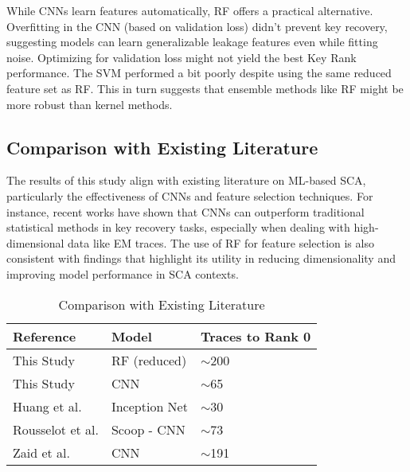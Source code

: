 \documentclass[runningheads]{llncs}
\begin{document}
While CNNs learn features automatically, RF offers a practical alternative. Overfitting in the CNN (based on validation loss) didn't prevent key recovery, suggesting models can learn generalizable leakage features even while fitting noise. Optimizing for validation loss might not yield the best Key Rank performance. The SVM performed a bit poorly despite using the same reduced feature set as RF. This in turn suggests that ensemble methods like RF might be more robust than kernel methods.

\subsection{Comparison with Existing Literature}
The results of this study align with existing literature on ML-based SCA, particularly the effectiveness of CNNs and feature selection techniques. For instance, recent works have shown that CNNs can outperform traditional statistical methods in key recovery tasks, especially when dealing with high-dimensional data like EM traces. The use of RF for feature selection is also consistent with findings that highlight its utility in reducing dimensionality and improving model performance in SCA contexts.
\begin{table}[htbp]
    \centering
    \caption{Comparison with Existing Literature}
    \label{tab:literature_comparison}
    \begin{tabular}{|p{3.5cm}|p{3.5cm}|p{3.5cm}|}
        
        \hline
        \textbf{Reference} & \textbf{Model} & \textbf{Traces to Rank 0} \\
        \hline
        This Study & RF (reduced) & $\sim$200  \\
        \hline
        This Study & CNN & $\sim$65  \\
        \hline
        Huang et al.\cite{huang2025deep} & Inception Net & $\sim$30   \\
        \hline
        Rousselot et al. \cite{rousselot2025scoop} & Scoop - CNN & $\sim$73  \\
        \hline
        Zaid et al. \cite{zaid2020methodology} & CNN & $\sim$191 \\
        
        \hline
    \end{tabular}
\end{table}
\end{document}
